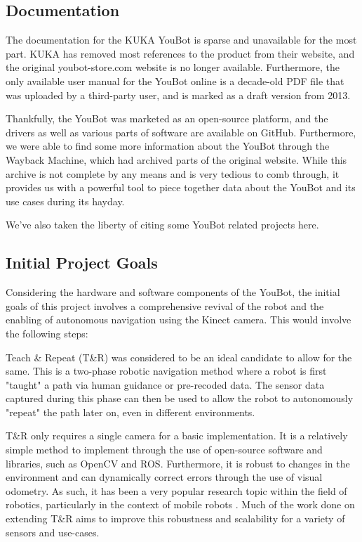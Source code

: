 \documentclass[a4paper, 12pt]{article}
\newif\ifshownotes
\newcommand{\notes}[1]{\ifshownotes\textcolor{blue}{#1}\fi}
\begin{document}
    \subsection{Documentation}

    The documentation for the KUKA YouBot is sparse and unavailable for the most part. KUKA has removed most references to the product from their website, and the original youbot-store.com website is no longer available. Furthermore, the only available user manual for the YouBot online is a decade-old PDF file that was uploaded by a third-party user, and is marked as a draft version from 2013. 

    Thankfully, the YouBot was marketed as an open-source platform, and the drivers as well as various parts of software are available on GitHub. Furthermore, we were able to find some more information about the YouBot through the Wayback Machine, which had archived parts of the original website. While this archive is not complete by any means and is very tedious to comb through, it provides us with a powerful tool to piece together data about the YouBot and its use cases during its hayday.

    We've also taken the liberty of citing some YouBot related projects here.

    \subsection{Initial Project Goals}

    Considering the hardware and software components of the YouBot, the initial goals of this project involves a comprehensive revival of the robot and the enabling of autonomous navigation using the Kinect camera. This would involve the following steps:

    Teach \& Repeat (T\&R) was considered to be an ideal candidate to allow for the same. This\notes{[cite]} is a two-phase robotic navigation method where a robot is first "taught" a path via human guidance or pre-recoded data. The sensor data captured during this phase can then be used to allow the robot to autonomously "repeat" the path later on, even in different environments.

    T\&R only requires a single camera for a basic implementation. It is a relatively simple method to implement through the use of open-source software and libraries, such as OpenCV and ROS. Furthermore, it is robust to changes in the environment and can dynamically correct errors through the use of visual odometry. As such, it has been a very popular research topic within the field of robotics, particularly in the context of mobile robots \notes{[cite]}. Much of the work done on extending T\&R aims to improve this robustness and scalability for a variety of sensors and use-cases. 
\end{document}
